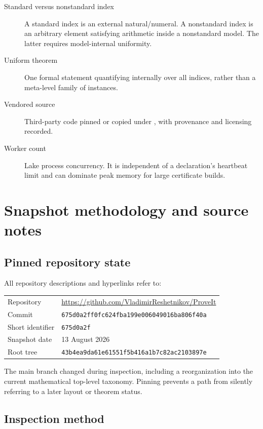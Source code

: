 \documentclass[
  10pt,
  a4paper,
  twoside,
  open=any,
  parskip=half,
  headings=big
]{scrreprt}
\newcommand{\CommitFull}{675d0a2ff0fc624fba199e006049016ba806f40a}
\newcommand{\CommitShort}{675d0a2f}
\newcommand{\SnapshotDate}{13 August 2026}
\newcommand{\RepoWeb}{https://github.com/VladimirReshetnikov/ProveIt}
\newcommand{\code}[1]{\texttt{\detokenize{#1}}}
\begin{document}
\begin{description}
  \item[Standard versus nonstandard index]
  A standard index is an external natural/numeral.  A nonstandard index is an
  arbitrary element satisfying arithmetic inside a nonstandard model.  The
  latter requires model-internal uniformity.

  \item[Uniform theorem]
  One formal statement quantifying internally over all indices, rather than a
  meta-level family of instances.

  \item[Vendored source]
  Third-party code pinned or copied under \code{lib}, with provenance and
  licensing recorded.

  \item[Worker count]
  Lake process concurrency.  It is independent of a declaration's heartbeat
  limit and can dominate peak memory for large certificate builds.
\end{description}

\chapter{Snapshot methodology and source notes}
\label{app:methodology}

\section{Pinned repository state}

All repository descriptions and hyperlinks refer to:

\begin{center}
\begin{tabular}{ll}
\toprule
Repository & \url{\RepoWeb}\\
Commit & \texttt{\CommitFull}\\
Short identifier & \texttt{\CommitShort}\\
Snapshot date & \SnapshotDate\\
Root tree & \texttt{43b4ea9da61e61551f5b416a1b7c82ac2103897e}\\
\bottomrule
\end{tabular}
\end{center}

The main branch changed during inspection, including a reorganization into the
current mathematical top-level taxonomy.  Pinning prevents a path from
silently referring to a later layout or theorem status.

\section{Inspection method}
\end{document}
